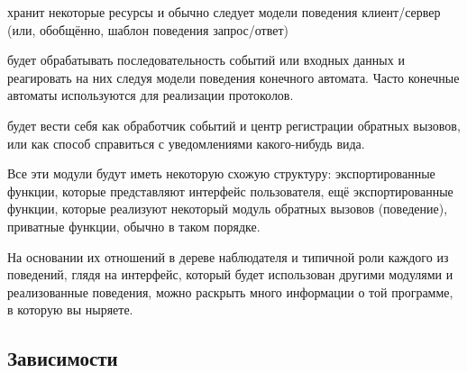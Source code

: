 \begin{itemize*}
	\item {} хранит некоторые ресурсы и обычно следует модели поведения клиент/сервер (или, обобщённо, шаблон поведения запрос/ответ)
	\item {} будет обрабатывать последовательность событий или входных данных и реагировать на них следуя модели поведения конечного автомата. Часто конечные автоматы используются для реализации протоколов.
	\item {} будет вести себя как обработчик событий и центр регистрации обратных вызовов, или как способ справиться с уведомлениями какого-нибудь вида.
\end{itemize*}

Все эти модули будут иметь некоторую схожую структуру: экспортированные функции, которые представляют интерфейс пользователя, ещё экспортированные функции, которые реализуют некоторый модуль обратных вызовов (поведение), приватные функции, обычно в таком порядке.

На основании их отношений в дереве наблюдателя и типичной роли каждого из поведений, глядя на интерфейс, который будет использован другими модулями и реализованные поведения, можно раскрыть много информации о той программе, в которую вы ныряете.


\subsection{Зависимости}
\label{subsec:dive-dependencies}

